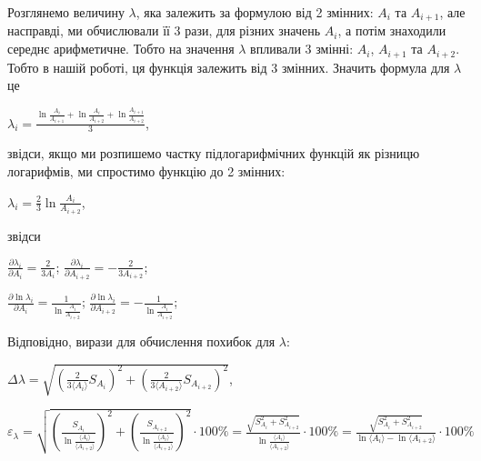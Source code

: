\documentclass[12pt,a4paper]{article}
\begin{document}
    Розглянемо величину $\lambda$, яка залежить за формулою від 2 змінних: $A_i$ та $A_{i+1}$, але насправді, ми обчислювали її 3 рази, для різних значень $A_i$, а потім знаходили середнє арифметичне.
    Тобто на значення $\lambda$ впливали 3 змінні: $A_i$, $A_{i+1}$ та $A_{i+2}$. Тобто в нашій роботі, ця функція залежить від 3 змінних.
    Значить формула для $\lambda$ це 

    \begin{center}
        $\displaystyle \lambda_i = \frac{\ln \frac{A_i}{A_{i+1}} + \ln \frac{A_i}{A_{i+2}} + \ln \frac{A_{i+1}}{A_{i+2}}}{3}$,
    \end{center}

    звідси, якщо ми розпишемо частку підлогарифмічних функцій як різницю логарифмів, ми спростимо функцію до 2 змінних:

    \begin{center}
        $\displaystyle \lambda_i = \frac{2}{3} \ln \frac{A_i}{A_{i+2}}$,
    \end{center}

    звідси

    \begin{center}
        $\displaystyle \frac{\partial \lambda_i}{\partial A_i} = \frac{2}{3A_i}$; $\displaystyle \frac{\partial \lambda_i}{\partial A_{i+2}} = -\frac{2}{3A_{i+2}}$;
    \end{center}

    \begin{center}
        $\displaystyle \frac{\partial \ln \lambda_i}{\partial A_i} = \frac{1}{\ln \frac{A_i}{A_{i+2}}}$; $\displaystyle \frac{\partial \ln \lambda_i}{\partial A_{i+2}} = -\frac{1}{\ln \frac{A_i}{A_{i+2}}}$;
    \end{center}

    Відповідно, вирази для обчислення похибок для $\lambda$:

    \begin{center}
        $\displaystyle \Delta \lambda = \sqrt{\left( \frac{2}{3\text{⟨}A_i\text{⟩}} S_{A_i} \right)^2 + \left( \frac{2}{3\text{⟨}A_{i+2}\text{⟩}} S_{A_{i+2}}\right)^2}$,
    \end{center}

    \begin{center}
        $\displaystyle \varepsilon_{\lambda} = \sqrt{\left( \frac{S_{A_i}}{\ln \frac{\text{⟨}A_i\text{⟩}}{\text{⟨}A_{i+2}\text{⟩}}}\right)^2 + \left( \frac{S_{A_{i+2}}}{\ln \frac{\text{⟨}A_i\text{⟩}}{\text{⟨}A_{i+2}\text{⟩}}} \right)^2} \cdot 100 \% =
        \frac{\sqrt{S_{A_i}^2 + S_{A_{i+2}}^2}}{\ln \frac{\text{⟨}A_i\text{⟩}}{\text{⟨}A_{i+2}\text{⟩}}} \cdot 100 \% = \frac{\sqrt{S_{A_i}^2 + S_{A_{i+2}}^2}}{\ln \text{⟨}A_i\text{⟩} - \ln \text{⟨}A_{i+2}\text{⟩}} \cdot 100 \%$
    \end{center}
\end{document}
